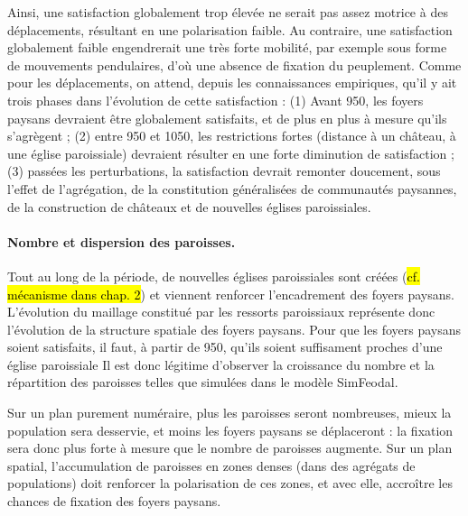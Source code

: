 Ainsi, une satisfaction globalement trop élevée ne serait pas assez motrice à des déplacements, résultant en une polarisation faible.
Au contraire, une satisfaction globalement faible engendrerait une très forte mobilité, par exemple sous forme de mouvements pendulaires, d'où une absence de fixation du peuplement.
Comme pour les déplacements, on attend, depuis les connaissances empiriques, qu'il y ait trois phases dans l'évolution de cette satisfaction :
(1) Avant 950, les foyers paysans devraient être globalement satisfaits, et de plus en plus à mesure qu'ils s'agrègent ;
(2) entre 950 et 1050, les restrictions fortes (distance à un château, à une église paroissiale) devraient résulter en une forte diminution de satisfaction ;
(3) passées les perturbations, la satisfaction devrait remonter doucement, sous l'effet de l'agrégation, de la constitution généralisées de communautés paysannes, de la construction de châteaux et de nouvelles églises paroissiales.

\paragraph{Nombre et dispersion des paroisses.}

Tout au long de la période, de nouvelles églises paroissiales sont créées (\hl{cf. mécanisme dans chap. 2}) et viennent renforcer l'encadrement des foyers paysans.
L'évolution du maillage constitué par les ressorts paroissiaux représente donc l'évolution de la structure spatiale des foyers paysans.
Pour que les foyers paysans soient satisfaits, il faut, à partir de 950, qu'ils soient suffisament proches d'une église paroissiale
Il est donc légitime d'observer la croissance du nombre et la répartition des paroisses telles que simulées dans le modèle SimFeodal.

Sur un plan purement numéraire, plus les paroisses seront nombreuses, mieux la population sera desservie, et moins les foyers paysans se déplaceront : la fixation sera donc plus forte à mesure que le nombre de paroisses augmente.
Sur un plan spatial, l'accumulation de paroisses en zones denses (dans des agrégats de populations) doit renforcer la polarisation de ces zones, et avec elle, accroître les chances de fixation des foyers paysans.

